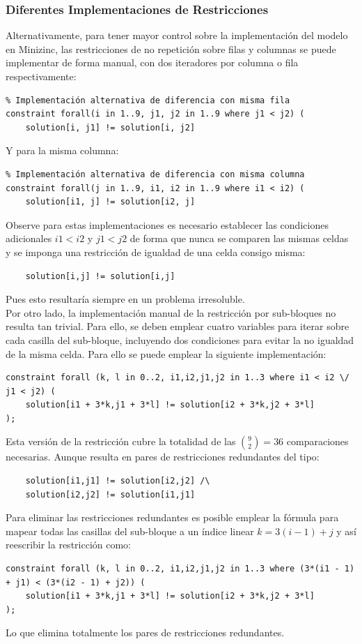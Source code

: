 \subsubsection{Diferentes Implementaciones de Restricciones}
Alternativamente, para tener mayor control sobre la implementación del modelo en Minizinc, las restricciones de no repetición sobre filas y columnas se puede implementar de forma manual, con dos iteradores por columna o fila respectivamente:
\begin{verbatim}
% Implementación alternativa de diferencia con misma fila
constraint forall(i in 1..9, j1, j2 in 1..9 where j1 < j2) (
    solution[i, j1] != solution[i, j2]
\end{verbatim}
Y para la misma columna:
\begin{verbatim}
% Implementación alternativa de diferencia con misma columna
constraint forall(j in 1..9, i1, i2 in 1..9 where i1 < i2) (
    solution[i1, j] != solution[i2, j]
\end{verbatim}
Observe para estas implementaciones es necesario establecer las condiciones adicionales $i1 < i2$ y $j1 < j2$ de forma que nunca se comparen las mismas celdas y se imponga una restricción de igualdad de una celda consigo misma:
\begin{verbatim}
    solution[i,j] != solution[i,j]
\end{verbatim}

Pues esto resultaría siempre en un problema irresoluble.\\

Por otro lado, la implementación manual de la restricción por sub-bloques no resulta tan trivial. Para ello, se deben emplear cuatro variables para iterar sobre cada casilla del sub-bloque, incluyendo dos condiciones para evitar la no igualdad de la misma celda. Para ello se puede emplear la siguiente implementación:
\begin{verbatim}
constraint forall (k, l in 0..2, i1,i2,j1,j2 in 1..3 where i1 < i2 \/ j1 < j2) (
    solution[i1 + 3*k,j1 + 3*l] != solution[i2 + 3*k,j2 + 3*l]
);
\end{verbatim}
Esta versión de la restricción cubre la totalidad de las $\binom{9}{2}=36$ comparaciones necesarias. Aunque resulta en pares de restricciones redundantes del tipo:
\begin{verbatim}
    solution[i1,j1] != solution[i2,j2] /\
    solution[i2,j2] != solution[i1,j1]
\end{verbatim}

Para eliminar las restricciones redundantes es posible emplear la fórmula para mapear todas las casillas del sub-bloque a un índice linear $k=3(i - 1) + j$ y así reescribir la restricción como:
\begin{verbatim}
constraint forall (k, l in 0..2, i1,i2,j1,j2 in 1..3 where (3*(i1 - 1) + j1) < (3*(i2 - 1) + j2)) (
    solution[i1 + 3*k,j1 + 3*l] != solution[i2 + 3*k,j2 + 3*l]
);
\end{verbatim}
Lo que elimina totalmente los pares de restricciones redundantes.

